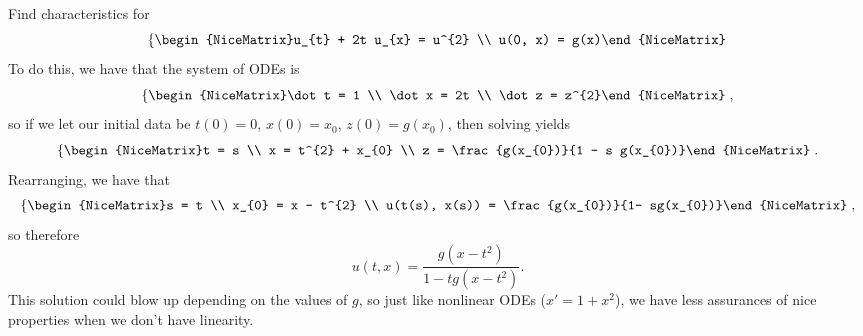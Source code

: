 \begin{example}[Semilinear]
	Find characteristics for
	\[ \left\{\begin{NiceMatrix}u_{t} + 2t u_{x} = u^{2} \\ u(0, x) = g(x)\end{NiceMatrix}\right. \]
	To do this, we have that the system of ODEs is
	\[ \left\{\begin{NiceMatrix}\dot t = 1 \\ \dot x = 2t \\ \dot z = z^{2}\end{NiceMatrix}\right.,\]
	so if we let our initial data be \( t(0) = 0 \), \( x(0) = x_{0} \), \( z(0) = g(x_{0}) \), then solving yields
	\[ \left\{\begin{NiceMatrix}t = s \\ x = t^{2} + x_{0} \\ z = \frac{g(x_{0})}{1 - s g(x_{0})}\end{NiceMatrix}\right..\]
	Rearranging, we have that
	\[ \left\{\begin{NiceMatrix}s = t \\ x_{0} = x - t^{2} \\ u(t(s), x(s)) = \frac{g(x_{0})}{1- sg(x_{0})}\end{NiceMatrix}\right.,\]
	so therefore
	\[ u(t, x) = \frac{g(x-t^{2})}{1-tg(x-t^{2})}.\]
	This solution could blow up depending on the values of \( g \), so just like nonlinear ODEs (\( x' = 1 + x^{2} \)), we have less assurances of nice properties when we don't have linearity.
\end{example}
